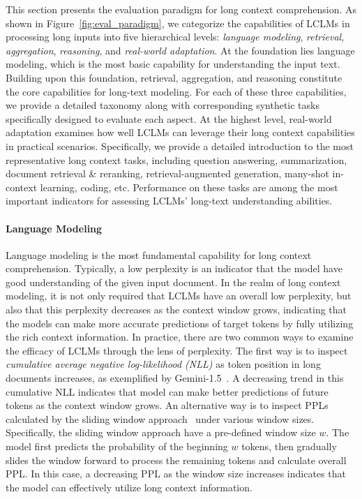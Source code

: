 \documentclass[11pt, a4paper, logo, copyright, nonumbering]{map}
\begin{document}
This section presents the evaluation paradigm for long context comprehension. As shown in Figure~\ref{fig:eval_paradigm}, we categorize the capabilities of LCLMs in processing long inputs into five hierarchical levels: \textit{language modeling}, \textit{retrieval}, \textit{aggregation}, \textit{reasoning}, and \textit{real-world adaptation}. 
At the foundation lies language modeling, which is the most basic capability for understanding the input text. 
Building upon this foundation, retrieval, aggregation, and reasoning constitute the core capabilities for long-text modeling. For each of these three capabilities, we provide a detailed taxonomy along with corresponding synthetic tasks specifically designed to evaluate each aspect.
At the highest level, real-world adaptation examines how well LCLMs can leverage their long context capabilities in practical scenarios. 
Specifically, we provide a detailed introduction to the most representative long context tasks, including question answering, summarization, document retrieval \& reranking, retrieval-augmented generation, many-shot in-context learning, coding, etc.
Performance on these tasks are among the most important indicators for assessing LCLMs' long-text understanding abilities.



\paragraph{Language Modeling} Language modeling is the most fundamental capability for long context comprehension. Typically, a low perplexity is an indicator that the model have good understanding of the given input document. In the realm of long context modeling, it is not only required that LCLMs have an overall low perplexity, but also that this perplexity decreases as the context window grows, indicating that the models can make more accurate predictions of target tokens by fully utilizing the rich context information. In practice, there are two common ways to examine the efficacy of LCLMs through the lens of perplexity. The first way is to inspect \textit{cumulative average negative log-likelihood (NLL)} as token position in long documents increases, as exemplified by Gemini-1.5~\citep{team2024gemini}. A decreasing trend in this cumulative NLL indicates that model can make better predictions of future tokens as the context window grows. An alternative way is to inspect PPLs calculated by the sliding window approach~\citep{press2021train,chen2023extending,zhu2023pose} under various window sizes. Specifically, the sliding window approach have a pre-defined window size $w$. The model first predicts the probability of the beginning $w$ tokens, then gradually slides the window forward to process the remaining tokens and calculate overall PPL. In this case, a decreasing PPL as the window size increases indicates that the model can effectively utilize long context information.
\end{document}
